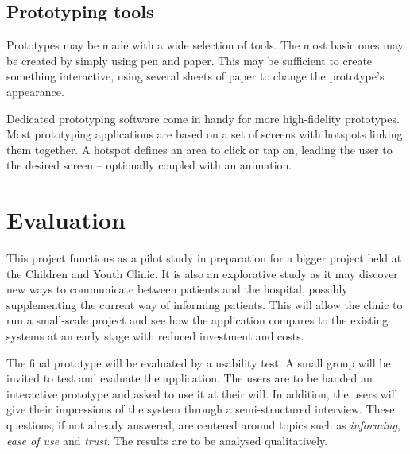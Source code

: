 \subsection{Prototyping tools}

Prototypes may be made with a wide selection of tools. The most basic ones may be created by simply using pen and paper. This may be sufficient to create something interactive, using several sheets of paper to change the prototype's appearance.

Dedicated prototyping software come in handy for more high-fidelity prototypes. Most prototyping applications are based on a set of screens with hotspots linking them together. A hotspot defines an area to click or tap on, leading the user to the desired screen -- optionally coupled with an animation. %


\section{Evaluation}
\label{sec:evaluation}

This project functions as a pilot study in preparation for a bigger project held at the Children and Youth Clinic. It is also an explorative study as it may discover new ways to communicate between patients and the hospital, possibly supplementing the current way of informing patients. This will allow the clinic to run a small-scale project and see how the application compares to the existing systems at an early stage with reduced investment and costs.

The final prototype will be evaluated by a usability test. A small group will be invited to test and evaluate the application. The users are to be handed an interactive prototype and asked to use it at their will. In addition, the users will give their impressions of the system through a semi-structured interview. These questions, if not already answered, are centered around topics such as \emph{informing}, \emph{ease of use} and \emph{trust}. The results are to be analysed qualitatively.

